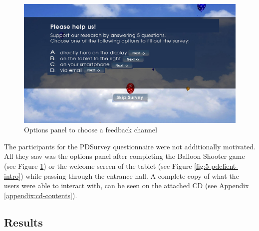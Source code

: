 		\begin{figure}
		    \begin{center}
				\includegraphics[width=.8\columnwidth]{img/screenshots/options-overview.jpg}
		    \end{center}
		 \caption{Options panel to choose a feedback channel}
		 \label{fig:5-feedback-options}
		\end{figure}


		The participants for the PDSurvey questionnaire were not additionally motivated. All they saw was the options panel after completing the Balloon Shooter game (see Figure \ref{fig:5-feedback-options}) or the welcome screen of the tablet (see Figure \ref{fig:5-pdclient-intro}) while passing through the entrance hall. A complete copy of what the users were able to interact with, can be seen on the attached CD (see Appendix \ref{appendix:cd-contents}).






\subsection{Results}





